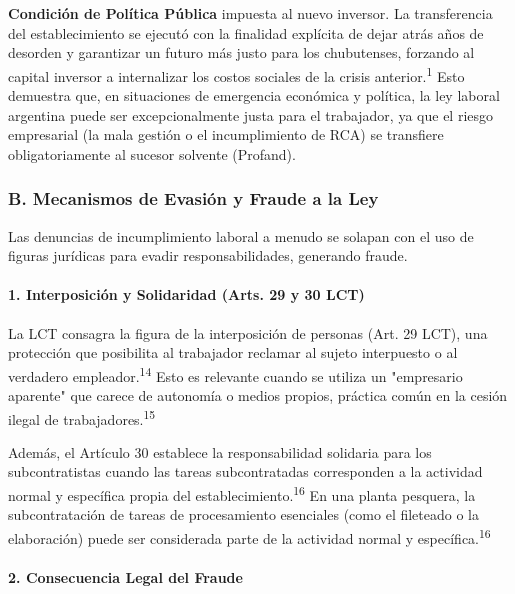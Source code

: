 \documentclass[]{article}
\begin{document}
\textbf{Condición de Política Pública} impuesta al nuevo inversor. La
transferencia del establecimiento se ejecutó con la finalidad explícita
de dejar atrás años de desorden y garantizar un futuro más justo para
los chubutenses, forzando al capital inversor a internalizar los costos
sociales de la crisis anterior.\textsuperscript{1} Esto demuestra que,
en situaciones de emergencia económica y política, la ley laboral
argentina puede ser excepcionalmente justa para el trabajador, ya que el
riesgo empresarial (la mala gestión o el incumplimiento de RCA) se
transfiere obligatoriamente al sucesor solvente (Profand).

\hypertarget{b.-mecanismos-de-evasiuxf3n-y-fraude-a-la-ley}{%
\subsubsection{B. Mecanismos de Evasión y Fraude a la
Ley}\label{b.-mecanismos-de-evasiuxf3n-y-fraude-a-la-ley}}

Las denuncias de incumplimiento laboral a menudo se solapan con el uso
de figuras jurídicas para evadir responsabilidades, generando fraude.

\hypertarget{interposiciuxf3n-y-solidaridad-arts.-29-y-30-lct}{%
\paragraph{1. Interposición y Solidaridad (Arts. 29 y 30
LCT)}\label{interposiciuxf3n-y-solidaridad-arts.-29-y-30-lct}}

La LCT consagra la figura de la interposición de personas (Art. 29 LCT),
una protección que posibilita al trabajador reclamar al sujeto
interpuesto o al verdadero empleador.\textsuperscript{14} Esto es
relevante cuando se utiliza un "empresario aparente" que carece de
autonomía o medios propios, práctica común en la cesión ilegal de
trabajadores.\textsuperscript{15}

Además, el Artículo 30 establece la responsabilidad solidaria para los
subcontratistas cuando las tareas subcontratadas corresponden a la
actividad normal y específica propia del
establecimiento.\textsuperscript{16} En una planta pesquera, la
subcontratación de tareas de procesamiento esenciales (como el fileteado
o la elaboración) puede ser considerada parte de la actividad normal y
específica.\textsuperscript{16}

\hypertarget{consecuencia-legal-del-fraude}{%
\paragraph{2. Consecuencia Legal del
Fraude}\label{consecuencia-legal-del-fraude}}
\end{document}
